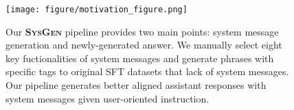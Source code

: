 \begin{figure}[t]
\centering
\texttt{[image: figure/motivation\_figure.png]}
\caption{
Our \textbf{\textsc{SysGen}} pipeline provides two main points: system message generation and newly-generated answer.
We manually select eight key fuctionalities of system messages and generate phrases with specific tags to original SFT datasets that lack of system messages.
Our pipeline generates better aligned assistant responses with system messages given user-oriented instruction.
}
\label{fig:motivation_figure}
\vspace{-0.5cm}
\end{figure}